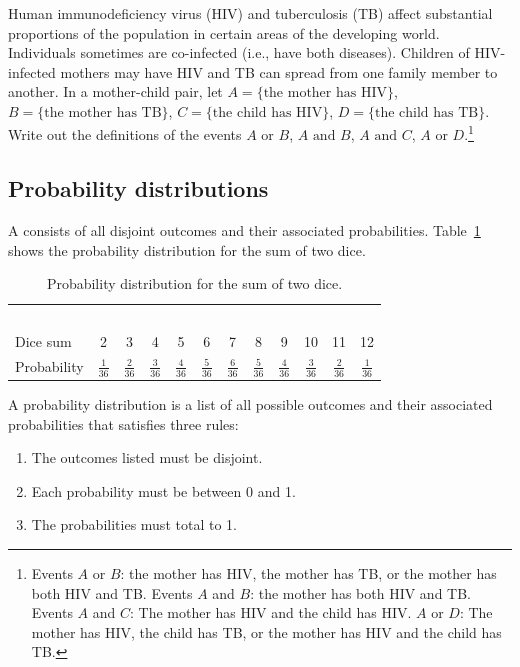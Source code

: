 \begin{exercise}
{Human immunodeficiency virus (HIV) and tuberculosis (TB) affect substantial proportions of the population in certain areas of the developing world. Individuals sometimes are co-infected (i.e., have both diseases). Children of HIV-infected mothers may have HIV and TB can spread from one family member to another.  In a mother-child pair, let $A = \{\text{the mother has HIV} \}$,  $B = \{\textrm{the mother has TB} \}$, $C = \{\text{the child has HIV} \}$,  $D = \{\text{the child has TB} \}$.  Write out the definitions of the events $A \text{ or } B$, $A \text{ and } B$, $A \text{ and } C$, $A \text{ or } D$.}\footnote{Events $A$ or $B$: the mother has HIV, the mother has TB, or the mother has both HIV and TB. Events $A$ and $B$: the mother has both HIV and TB. Events $A$ and $C$: The mother has HIV and the child has HIV. $A$ or $D$: The mother has HIV, the child has TB, or the mother has HIV and the child has TB.}

\end{exercise}

\subsection{Probability distributions}
\label{introProbDistributions}

A  consists of all disjoint outcomes and their associated probabilities. Table~\ref{diceProb} shows the probability distribution for the sum of two dice. 

\begin{table}[h] \small
\centering
\begin{tabular}{l ccc ccc ccc cc}
  \hline
  \ \vspace{-3mm} \\
Dice sum\vspace{0.3mm} & 2 & 3 & 4 & 5 & 6 & 7 & 8 & 9 & 10 & 11 & 12  \\
Probability & $\frac{1}{36}$ & $\frac{2}{36}$ & $\frac{3}{36}$ & $\frac{4}{36}$ & $\frac{5}{36}$ & $\frac{6}{36}$ & $\frac{5}{36}$ & $\frac{4}{36}$ & $\frac{3}{36}$ & $\frac{2}{36}$ & $\frac{1}{36}$\vspace{1mm} \\
   \hline
\end{tabular}
\caption{Probability distribution for the sum of two dice.}
\label{diceProb}
\end{table}

\begin{termBox}{
A probability distribution is a list of all possible outcomes and their associated probabilities that satisfies three rules: \vspace{-2mm}
\begin{enumerate}
\setlength{\itemsep}{0mm}
\item The outcomes listed must be disjoint.
\item Each probability must be between 0 and 1.
\item The probabilities must total to 1. \vspace{1mm}
\end{enumerate}}
\end{termBox}

